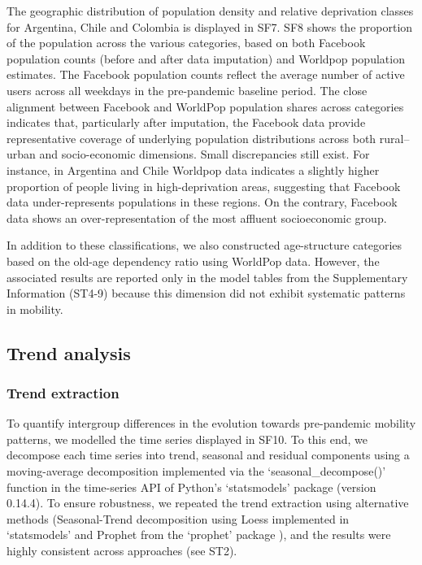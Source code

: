 \documentclass[fleqn,10pt]{wlscirep}
\begin{document}
The geographic distribution of population density and relative deprivation classes for Argentina, Chile and Colombia is displayed in SF7. SF8 shows the proportion of the population across the various categories, based on both Facebook population counts (before and after data imputation) and Worldpop population estimates. The Facebook population counts reflect the average number of active users across all weekdays in the pre-pandemic baseline period. The close alignment between Facebook and WorldPop population shares across categories indicates that, particularly after imputation, the Facebook data provide representative coverage of underlying population distributions across both rural–urban and socio-economic dimensions. Small discrepancies still exist. For instance, in Argentina and Chile Worldpop data indicates a slightly higher proportion of people living in high-deprivation areas, suggesting that Facebook data under-represents populations in these regions. On the contrary, Facebook data shows an over-representation of the most affluent socioeconomic group. 

In addition to these classifications, we also constructed age-structure categories based on the old-age dependency ratio using WorldPop data. However, the associated results are reported only in the model tables from the Supplementary Information (ST4-9) because this dimension did not exhibit systematic patterns in mobility.

\subsection*{Trend analysis}

\subsubsection*{Trend extraction}

To quantify intergroup differences in the evolution towards pre-pandemic mobility patterns, we modelled the time series displayed in SF10. To this end, we decompose each time series into trend, seasonal and residual components using a moving-average decomposition implemented via the `seasonal\_decompose()' function in the time-series API of Python’s `statsmodels' package (version 0.14.4). To ensure robustness, we repeated the trend extraction using alternative methods (Seasonal-Trend decomposition using Loess \cite{cleveland1990stl} implemented in `statsmodels' and Prophet from the `prophet' package \cite{prophet17}), and the results were highly consistent across approaches (see ST2). 
\end{document}

